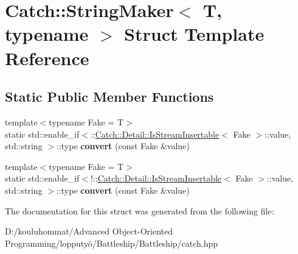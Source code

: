 \hypertarget{struct_catch_1_1_string_maker}{}\section{Catch\+:\+:String\+Maker$<$ T, typename $>$ Struct Template Reference}
\label{struct_catch_1_1_string_maker}
\subsection*{Static Public Member Functions}
\begin{DoxyCompactItemize}
\item 
\mbox{\label{struct_catch_1_1_string_maker_ab2c357e22b754802c4b1351257103eb6}} 
{\footnotesize template$<$typename Fake  = T$>$ }\\static std\+::enable\+\_\+if$<$\+::\mbox{\hyperlink{class_catch_1_1_detail_1_1_is_stream_insertable}{Catch\+::\+Detail\+::\+Is\+Stream\+Insertable}}$<$ Fake $>$\+::value, std\+::string $>$\+::type {\bfseries convert} (const Fake \&value)
\item 
\mbox{\label{struct_catch_1_1_string_maker_a68bb548de0e5ad364228b1ca3dd2f561}} 
{\footnotesize template$<$typename Fake  = T$>$ }\\static std\+::enable\+\_\+if$<$!\+::\mbox{\hyperlink{class_catch_1_1_detail_1_1_is_stream_insertable}{Catch\+::\+Detail\+::\+Is\+Stream\+Insertable}}$<$ Fake $>$\+::value, std\+::string $>$\+::type {\bfseries convert} (const Fake \&value)
\end{DoxyCompactItemize}


The documentation for this struct was generated from the following file\+:\begin{DoxyCompactItemize}
\item 
D\+:/kouluhommat/\+Advanced Object-\/\+Oriented Programming/lopputyö/\+Battleship/\+Battleship/catch.\+hpp\end{DoxyCompactItemize}
